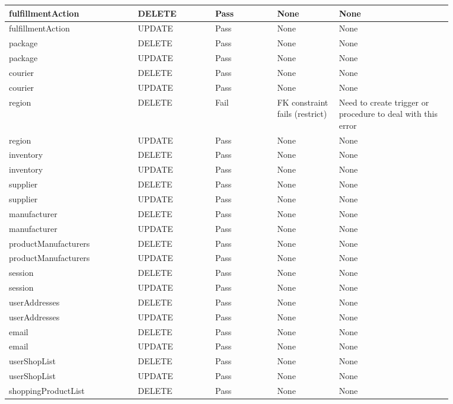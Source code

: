 \begin{spacing}{1.25}
\begin{longtable}{ | p{0.25\linewidth} | p{0.15\linewidth} | p{0.126\linewidth} | p{0.128\linewidth} | p{0.22\linewidth} | }
fulfillmentAction			&	DELETE		&	Pass		&	None							&	None				\\\hline
fulfillmentAction			&	UPDATE		&	Pass		&	None							&	None				\\\hline
package						&	DELETE		&	Pass		&	None							&	None				\\\hline
package						&	UPDATE		&	Pass		&	None							&	None				\\\hline
courier						&	DELETE		&	Pass		&	None							&	None				\\\hline
courier						&	UPDATE		&	Pass		&	None							&	None				\\\hline
region						&	DELETE		&	Fail		&	FK constraint fails (restrict)	&	Need to create trigger or procedure to deal with this error\\\hline
region						&	UPDATE		&	Pass		&	None							&	None				\\\hline
inventory					&	DELETE		&	Pass		&	None							&	None				\\\hline
inventory					&	UPDATE		&	Pass		&	None							&	None				\\\hline
supplier					&	DELETE		&	Pass		&	None							&	None				\\\hline
supplier					&	UPDATE		&	Pass		&	None							&	None				\\\hline
manufacturer				&	DELETE		&	Pass		&	None							&	None				\\\hline
manufacturer				&	UPDATE		&	Pass		&	None							&	None				\\\hline
productManufacturers		&	DELETE		&	Pass		&	None							&	None				\\\hline
productManufacturers		&	UPDATE		&	Pass		&	None							&	None				\\\hline
session						&	DELETE		&	Pass		&	None							&	None				\\\hline
session						&	UPDATE		&	Pass		&	None							&	None				\\\hline
userAddresses				&	DELETE		&	Pass		&	None							&	None				\\\hline
userAddresses				&	UPDATE		&	Pass		&	None							&	None				\\\hline
email						&	DELETE		&	Pass		&	None							&	None				\\\hline
email						&	UPDATE		&	Pass		&	None							&	None				\\\hline
userShopList				&	DELETE		&	Pass		&	None							&	None				\\\hline
userShopList				&	UPDATE		&	Pass		&	None							&	None				\\\hline
shoppingProductList			&	DELETE		&	Pass		&	None							&	None				\\\hline

\end{longtable}
\end{spacing}
